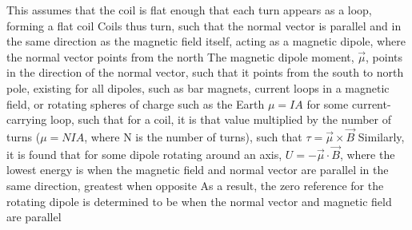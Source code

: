 \documentclass[11 pt, twoside]{article}
\newenvironment{outline*}
{
	\begin{outline}[enumerate]
	}
	{\end{outline}
}
\begin{document}
\begin{outline*}
\3 This assumes that the coil is flat enough that each turn appears as a loop, forming a flat coil
\2 Coils thus turn, such that the normal vector is parallel and in the same direction as the magnetic field itself, acting as a magnetic dipole, where the normal vector points from the north
\1 The magnetic dipole moment, $\vec{\mu}$, points in the direction of the normal vector, such that it points from the south to north pole, existing for all dipoles, such as bar magnets, current loops in a magnetic field, or rotating spheres of charge such as the Earth
\2 $\mu = IA$ for some current-carrying loop, such that for a coil, it is that value multiplied by the number of turns ($\mu = NIA$, where N is the number of turns), such that $\tau = \vec{\mu} \times \vec{B}$
\2 Similarly, it is found that for some dipole rotating around an axis, $U = -\vec{\mu} \cdot \vec{B}$, where the lowest energy is when the magnetic field and normal vector are parallel in the same direction, greatest when opposite
\3 As a result, the zero reference for the rotating dipole is determined to be when the normal vector and magnetic field are parallel
\end{outline*}
\end{document}
